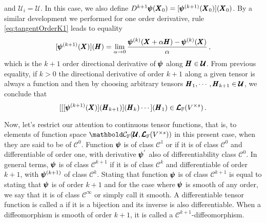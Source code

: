 and $\pmb{\mathcal{U}}_i=\pmb{\mathcal{U}}$. In this case, we also define $D^{k+1}\pmb{\psi}(\pmb{X}_0)=[\pmb{\psi}^{(k+1)}(\pmb{X}_0)](\pmb{X}_0)$. By a similar development we performed for one order derivative, rule \eqref{eq:tangentOrderK1} leads to equality
\begin{equation}\label{eq:directDerivK1}
[\pmb{\psi}^{(k+1)}(\pmb{X})](\pmb{H})=\lim_{\alpha\to 0} \dfrac{\pmb{\psi}^{(k)}(\pmb{X}+\alpha\pmb{H})-\pmb{\psi}^{(k)}(\pmb{X})}{\alpha}\,,
\end{equation}
which is the $k+1$ order directional derivative of $\pmb{\psi}$ along $\pmb{H}\in\pmb{\mathcal{U}}$. From previous equality, if $k>0$ the directional derivative of order $k+1$ along a given tensor is always a function and then by choosing arbitrary tensors $\pmb{H}_1,\cdots,\pmb{H}_{k+1}\in\pmb{\mathcal{U}}$, we conclude that
\begin{equation}\label{eq:toOrderZero}
[[[\pmb{\psi}^{(k+1)}(\pmb{X})](\pmb{H}_{k+1})](\pmb{H}_k)\cdots](\pmb{H}_{1})\in\pmb{\mathcal{L}}_{\mathbb{F}}(V^{\times s})\,.
\end{equation}

Now, let's restrict our attention to continuous tensor functions, that is, to elements of function space $\evc{\cam{F}}{\pmb{\mathcal{U}}}{\ete{\cam{F}}{V^{\times s}}}$ in this present case, when they are said to be of  $\mathcal{C}^0$. Function $\pmb{\psi}$ is of class $\mathcal{C}^1$ or  if it is of class $\mathcal{C}^0$ and differentiable of order one, with derivative $\pmb{\psi}^{'}$ also of differentiability class $\mathcal{C}^0$. In general terms, $\pmb{\psi}$ is of class $\mathcal{C}^{k+1}$ if it is of class $\mathcal{C}^{k}$ and differentiable of order $k+1$, with $\pmb{\psi}^{(k+1)}$ of class $\mathcal{C}^k$. Stating that function $\pmb{\psi}$ is of class $\mathcal{C}^{k+1}$ is equal to stating that $\pmb{\psi}$ is  of order $k+1$ and for the case where $\pmb{\psi}$ is smooth of any order, we say that it is of class $\mathcal{C}^\infty$ or simply call it smooth. A differentiable tensor function is called a  if it is a bijection and its inverse is also differentiable. When a diffeomorphism is smooth of order $k+1$, it is called a $\mathcal{C}^{k+1}$-diffeomorphism.




